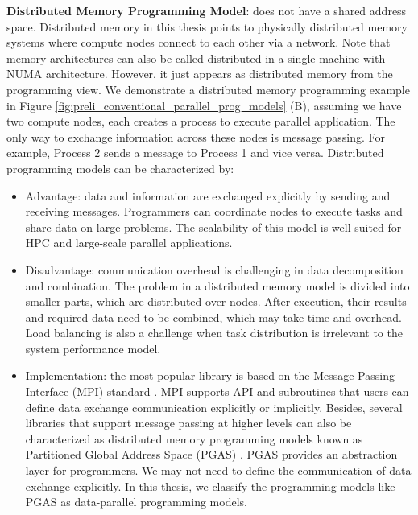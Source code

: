 \noindent \textbf{Distributed Memory Programming Model}: does not have a shared address space. Distributed memory in this thesis points to physically distributed memory systems where compute nodes connect to each other via a network. Note that memory architectures can also be called distributed in a single machine with NUMA architecture. However, it just appears as distributed memory from the programming view. We demonstrate a distributed memory programming example in Figure \ref{fig:preli_conventional_parallel_prog_models} (B), assuming we have two compute nodes, each creates a process to execute parallel application. The only way to exchange information across these nodes is message passing. For example, Process 2 sends a message to Process 1 and vice versa. Distributed programming models can be characterized by:
\begin{itemize}
	\item Advantage: data and information are exchanged explicitly by sending and receiving messages. Programmers can coordinate nodes to execute tasks and share data on large problems. The scalability of this model is well-suited for HPC and large-scale parallel applications.
	\item Disadvantage: communication overhead is challenging in data decomposition and combination. The problem in a distributed memory model is divided into smaller parts, which are distributed over nodes. After execution, their results and required data need to be combined, which may take time and overhead. Load balancing is also a challenge when task distribution is irrelevant to the system performance model.
	\item Implementation: the most popular library is based on the Message Passing Interface (MPI) standard \cite{gropp1996mpich}. MPI supports API and subroutines that users can define data exchange communication explicitly or implicitly. Besides, several libraries that support message passing at higher levels can also be characterized as distributed memory programming models known as Partitioned Global Address Space (PGAS) \cite{dewael2015pgasl}. PGAS provides an abstraction layer for programmers. We may not need to define the communication of data exchange explicitly. In this thesis, we classify the programming models like PGAS as data-parallel programming models.
\end{itemize}

